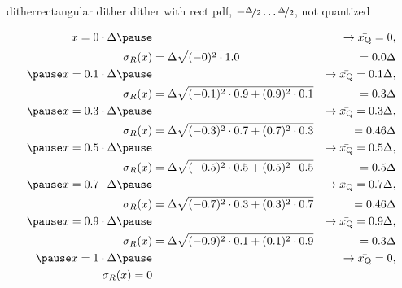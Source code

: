 	\begin{frame}{dither}{rectangular dither}
        \vspace{-3mm}
        dither with rect pdf, $-\nicefrac{\Delta}{2}\ldots \nicefrac{\Delta}{2}$, not quantized
        \begin{footnotesize}
        \begin{eqnarray*}
               x = 0 \cdot \Delta \pause &&\rightarrow \bar{x_\mathrm{Q}} =0,\\ 
            \sigma_R(x) &= \Delta\sqrt{(-0)^2\cdot 1.0} &= 0.0\Delta\\
            \pause
            \smallskip
               x = 0.1 \cdot \Delta \pause &&\rightarrow \bar{x_\mathrm{Q}} = 0.1\Delta ,\\ 
            \sigma_R(x) &= \Delta\sqrt{(-0.1)^2\cdot0.9 + (0.9)^2\cdot0.1} &= 0.3\Delta \\ 
            \pause
            \smallskip
                x  = 0.3 \cdot \Delta \pause &&\rightarrow \bar{x_\mathrm{Q}}= 0.3\Delta ,\\ 
            \sigma_R(x) &= \Delta\sqrt{(-0.3)^2\cdot0.7 + (0.7)^2\cdot0.3} &= 0.46\Delta \\ 
            \pause
            \smallskip
               x  = 0.5 \cdot \Delta \pause &&\rightarrow \bar{x_\mathrm{Q}}= 0.5\Delta ,\\ 
            \sigma_R(x) &= \Delta\sqrt{(-0.5)^2\cdot0.5 + (0.5)^2\cdot0.5} &= 0.5\Delta \\ 
            \pause
            \smallskip
               x  = 0.7 \cdot \Delta \pause &&\rightarrow \bar{x_\mathrm{Q}}= 0.7\Delta ,\\ 
            \sigma_R(x) &= \Delta\sqrt{(-0.7)^2\cdot0.3 + (0.3)^2\cdot0.7} &= 0.46\Delta \\ 
            \pause
            \smallskip
               x  = 0.9 \cdot \Delta \pause &&\rightarrow \bar{x_\mathrm{Q}}= 0.9\Delta ,\\ 
            \sigma_R(x) &= \Delta\sqrt{(-0.9)^2\cdot0.1 + (0.1)^2\cdot0.9} &= 0.3\Delta \\ 
            \pause
            \smallskip
               x = 1 \cdot \Delta \pause &&\rightarrow \bar{x_\mathrm{Q}} =0,\\ 
            \sigma_R(x) = 0&&
        \end{eqnarray*}
        \end{footnotesize}
	\end{frame}	
